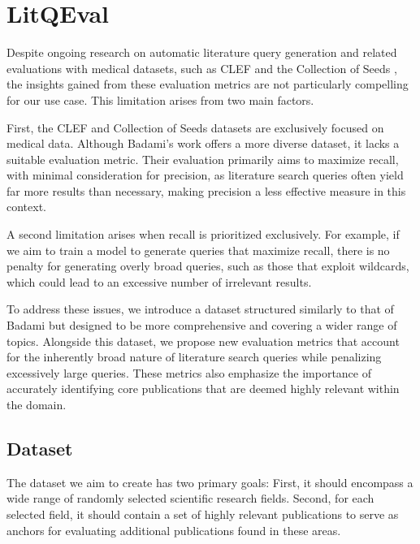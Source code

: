 \chapter{LitQEval}\label{ch:ownApproach}
Despite ongoing research on automatic literature query generation and related evaluations with medical datasets, such as CLEF \autocite{kanoulas2017clef, kanoulas2018clef, kanoulas2019clef} and the Collection of Seeds \autocite{Wang_2022}, the insights gained from these evaluation metrics are not particularly compelling for our use case. This limitation arises from two main factors. 

First, the CLEF and Collection of Seeds datasets are exclusively focused on medical data. Although Badami's work \autocite{badami2023adaptive} offers a more diverse dataset, it lacks a suitable evaluation metric. Their evaluation primarily aims to maximize recall, with minimal consideration for precision, as literature search queries often yield far more results than necessary, making precision a less effective measure in this context. 

A second limitation arises when recall is prioritized exclusively. For example, if we aim to train a model to generate queries that maximize recall, there is no penalty for generating overly broad queries, such as those that exploit wildcards, which could lead to an excessive number of irrelevant results.

To address these issues, we introduce a dataset structured similarly to that of Badami \autocite{badami2023adaptive} but designed to be more comprehensive and covering a wider range of topics. Alongside this dataset, we propose new evaluation metrics that account for the inherently broad nature of literature search queries while penalizing excessively large queries. These metrics also emphasize the importance of accurately identifying core publications that are deemed highly relevant within the domain.
\section{Dataset}
The dataset we aim to create has two primary goals: First, it should encompass a wide range of randomly selected scientific research fields. Second, for each selected field, it should contain a set of highly relevant publications to serve as anchors for evaluating additional publications found in these areas.


